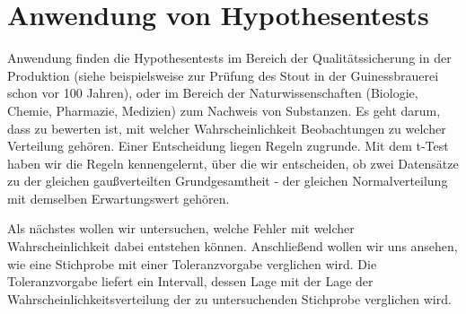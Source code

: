 \section{Anwendung von Hypothesentests}

Anwendung finden die Hypothesentests im Bereich der Qualitätssicherung in der Produktion (siehe beispielsweise
zur Prüfung des Stout in der Guinessbrauerei schon vor 100 Jahren), oder im Bereich der Naturwissenschaften
(Biologie, Chemie, Pharmazie, Medizien) zum Nachweis von Substanzen. Es geht darum, dass zu bewerten ist,
mit welcher Wahrscheinlichkeit Beobachtungen zu welcher Verteilung gehören.
Einer Entscheidung liegen Regeln zugrunde. Mit dem t-Test haben wir die Regeln kennengelernt, über
die wir entscheiden, ob zwei Datensätze zu der gleichen gaußverteilten Grundgesamtheit - der gleichen
Normalverteilung mit demselben Erwartungswert gehören. 

Als nächstes wollen wir untersuchen, welche Fehler mit welcher Wahrscheinlichkeit dabei entstehen können.
Anschließend wollen wir uns ansehen, wie eine Stichprobe mit einer Toleranzvorgabe verglichen wird.
Die Toleranzvorgabe liefert ein Intervall, dessen Lage mit der Lage der Wahrscheinlichkeitsverteilung
der zu untersuchenden Stichprobe verglichen wird.

